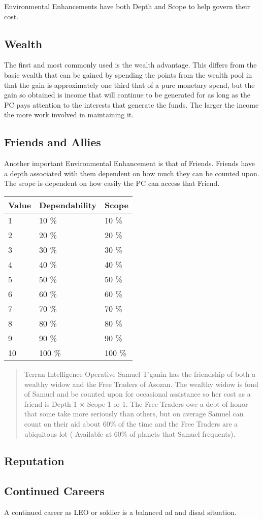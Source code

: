 Environmental Enhancements have both Depth and Scope to help govern 
their cost. 

\subsection{Wealth}

The first and most commonly used is the wealth advantage. This differs
from the basic wealth that can be gained by spending the points from the
wealth pool in that the gain is approximately one third that of a pure
monetary spend, but the gain so obtained is income that will continue to
be generated for as long as the PC pays attention to the interests that
generate the funds. The larger the income the more work involved in
maintaining it. 

\subsection{Friends and Allies}
Another important Environmental Enhancement is that of Friends. Friends
have a depth associated with them dependent on how much they can be
counted upon. The scope is dependent on how easily the PC can access
that Friend. 

\begin{tabular}{||l|l|l||} \hline
	Value	&	Dependability & Scope \\ \hline
	1		&	10 \% & 10 \%	\\
	2		&	20 \% & 20 \%	\\
	3		&	30 \% & 30 \%	\\
	4		&	40 \% & 40 \%	\\
	5		&	50 \% & 50 \%	\\
	6		&	60 \% & 60 \%	\\
	7		&	70 \% & 70 \%	\\
	8		&	80 \% & 80 \%	\\
	9		&	90 \% & 90 \%	\\
	10		&	100 \% & 100 \%	\\ \hline
\end{tabular}

\begin{quote}
Terran Intelligence Operative Samuel T'ganin has the friendship of both
a wealthy widow and the Free Traders of Asozan. The wealthy widow is
fond of Samuel and be counted upon for occasional assistance so her cost
as a friend is Depth 1 \( \times \) Scope 1 or 1. The Free Traders owe a
debt of honor that some take more seriously than others, but on average
Samuel can count on their aid about 60\% of the time and the Free
Traders are a ubiquitous lot ( Available at 60\% of planets that Samuel
frequents).
\end{quote} 
 
\subsection{Reputation}
\subsection{Continued Careers}
A continued career as  LEO or soldier is a balanced ad and disad situation.




